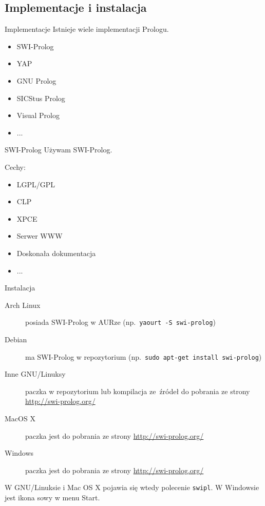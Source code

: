 \documentclass[blue]{beamer}
\begin{document}
\subsection{Implementacje i instalacja}
\begin{frame}{Implementacje}
Istnieje wiele implementacji Prologu.
\begin{itemize}
\item SWI-Prolog
\item YAP
\item GNU Prolog
\item SICStus Prolog
\item Visual Prolog
\item ...
\end{itemize}
\end{frame}
\begin{frame}{SWI-Prolog}
Używam SWI-Prolog.

Cechy:
\begin{itemize}
\item LGPL/GPL
\item CLP
\item XPCE
\item Serwer WWW
\item Doskonała dokumentacja
\item ...
\end{itemize}
\end{frame}
\begin{frame}[fragile]{Instalacja}
\begin{description}
\item[Arch Linux] posiada SWI-Prolog w AURze (np.~\verb+yaourt -S swi-prolog+)
\item[Debian] ma SWI-Prolog w repozytorium (np.~\verb+sudo apt-get install swi-prolog+)
\item[Inne GNU/Linuksy] paczka w repozytorium lub kompilacja ze~źródeł do pobrania ze strony \url{http://swi-prolog.org/}
\item[MacOS X] paczka jest do pobrania ze strony \url{http://swi-prolog.org/}
\item[Windows] paczka jest do pobrania ze strony \url{http://swi-prolog.org/}
\end{description}

W GNU/Linuksie i Mac OS X pojawia się wtedy polecenie \verb+swipl+. W Windowsie jest ikona sowy w menu Start.
\end{frame}
\end{document}
